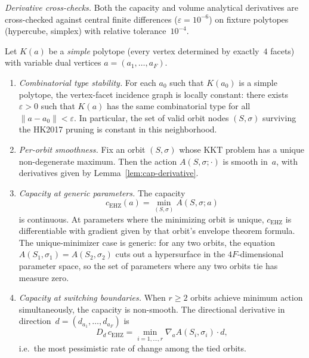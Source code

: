 \emph{Derivative cross-checks.}
Both the capacity and volume analytical derivatives are cross-checked against
central finite differences ($\varepsilon = 10^{-6}$) on fixture polytopes
(hypercube, simplex) with relative tolerance~$10^{-4}$.

\begin{unverified}
\begin{proposition}
\label{prop:capacity-piecewise-smooth}
Let $K(a)$ be a \emph{simple} polytope (every vertex determined by exactly~$4$
facets) with variable dual vertices $a = (a_1,\dots,a_F)$.
\begin{enumerate}
\item[\textup{(a)}]
  \emph{Combinatorial type stability.}
  For each $a_0$ such that $K(a_0)$ is a simple polytope, the vertex-facet
  incidence graph is locally constant: there exists $\varepsilon > 0$ such that
  $K(a)$ has the same combinatorial type for all $\|a - a_0\| < \varepsilon$.
  In particular, the set of valid orbit nodes $(S,\sigma)$ surviving
  the HK2017 pruning is constant in this neighborhood.

\item[\textup{(b)}]
  \emph{Per-orbit smoothness.}
  Fix an orbit $(S,\sigma)$ whose KKT problem has a unique non-degenerate
  maximum. Then the action $A(S,\sigma;\cdot)$ is smooth in~$a$,
  with derivatives given by Lemma~\ref{lem:cap-derivative}.

\item[\textup{(c)}]
  \emph{Capacity at generic parameters.}
  The capacity
  \[ c_{\mathrm{EHZ}}(a) = \min_{(S,\sigma)} A(S,\sigma;a) \]
  is continuous.
  At parameters where the minimizing orbit is unique, $c_{\mathrm{EHZ}}$ is
  differentiable with gradient given by that orbit's envelope theorem
  formula. The unique-minimizer case is generic: for any two orbits,
  the equation $A(S_1,\sigma_1) = A(S_2,\sigma_2)$ cuts out a hypersurface
  in the $4F$-dimensional parameter space, so the set of parameters where
  any two orbits tie has measure zero.

\item[\textup{(d)}]
  \emph{Capacity at switching boundaries.}
  When $r \ge 2$ orbits achieve minimum action simultaneously,
  the capacity is non-smooth.
  The directional derivative in direction~$d = (d_{a_1},\dots,d_{a_F})$ is
  \[
    D_d\,c_{\mathrm{EHZ}}
    = \min_{i=1,\dots,r} \nabla_a A(S_i,\sigma_i) \cdot d,
  \]
  i.e.\ the most pessimistic rate of change among the tied orbits.
\end{enumerate}
\end{proposition}


\end{unverified}
